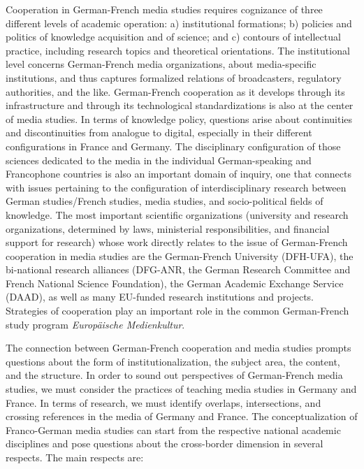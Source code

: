 \documentclass{tufte-handout}
\begin{document}
Cooperation in German-French media studies requires cognizance of three
different levels of academic operation: a) institutional formations; b)
policies and politics of knowledge acquisition and of science; and c)
contours of intellectual practice, including research topics and
theoretical orientations. The institutional level concerns German-French
media organizations, about media-specific institutions, and thus
captures formalized relations of broadcasters, regulatory authorities,
and the like. German-French cooperation as it develops through its
infrastructure and through its technological standardizations is also at
the center of media studies. In terms of knowledge policy, questions
arise about continuities and discontinuities from analogue to digital,
especially in their different configurations in France and Germany. The
disciplinary configuration of those sciences dedicated to the media in
the individual German-speaking and Francophone countries is also an
important domain of inquiry, one that connects with issues pertaining to
the configuration of interdisciplinary research between German
studies/French studies, media studies, and socio-political fields of
knowledge. The most important scientific organizations (university and
research organizations, determined by laws, ministerial
responsibilities, and financial support for research) whose work
directly relates to the issue of German-French cooperation in media
studies are the German-French University (DFH-UFA), the bi-national
research alliances (DFG-ANR, the German Research Committee and French
National Science Foundation), the German Academic Exchange Service
(DAAD), as well as many EU-funded research institutions and projects.
Strategies of cooperation play an important role in the common
German-French study program \emph{Europäische Medienkultur}.

The connection between German-French cooperation and media studies
prompts questions about the form of institutionalization, the subject
area, the content, and the structure. In order to sound out perspectives
of German-French media studies, we must consider the practices of
teaching media studies in Germany and France. In terms of research, we
must identify overlaps, intersections, and crossing references in the
media of Germany and France. The conceptualization of Franco-German
media studies can start from the respective national academic
disciplines and pose questions about the cross-border dimension in
several respects. The main respects are:
\end{document}
